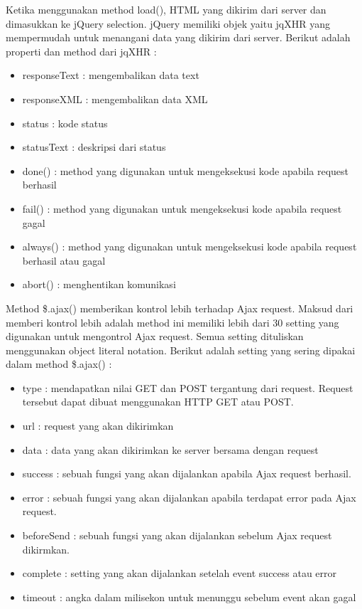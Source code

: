 Ketika menggunakan method load(), HTML yang dikirim dari server dan dimasukkan ke jQuery selection. jQuery memiliki objek yaitu jqXHR yang mempermudah untuk menangani data yang dikirim dari server. Berikut adalah properti dan method dari jqXHR :

\begin{itemize}
	\item responseText : mengembalikan data text
	\item responseXML : mengembalikan data XML
	\item status : kode status
	\item statusText : deskripsi dari status
	\item done() : method yang digunakan untuk mengeksekusi kode apabila request berhasil
	\item fail() : method yang digunakan untuk mengeksekusi kode apabila request gagal
	\item always() : method yang digunakan untuk mengeksekusi kode apabila request berhasil atau gagal
	\item abort() : menghentikan komunikasi
\end{itemize} 

Method \$.ajax() memberikan kontrol lebih terhadap Ajax request. Maksud dari memberi kontrol lebih adalah method ini memiliki lebih dari 30 setting yang digunakan untuk mengontrol Ajax request. Semua setting dituliskan menggunakan object literal notation. Berikut adalah setting yang sering dipakai dalam method \$.ajax() :

\begin{itemize}
	\item type : mendapatkan nilai GET dan POST tergantung dari request. Request tersebut dapat dibuat menggunakan HTTP GET atau POST.
	\item url : request yang akan dikirimkan
	\item data : data yang akan dikirimkan ke server bersama dengan request
	\item success : sebuah fungsi yang akan dijalankan apabila Ajax request berhasil. 
	\item error : sebuah fungsi yang akan dijalankan apabila terdapat error pada Ajax request. 
	\item beforeSend : sebuah fungsi yang akan dijalankan sebelum Ajax request dikirmkan.
	\item complete : setting yang akan dijalankan setelah event success atau error
	\item timeout : angka dalam milisekon untuk menunggu sebelum event akan gagal
\end{itemize}


